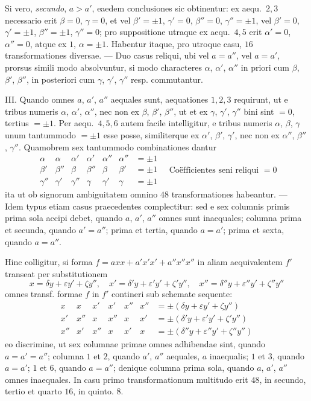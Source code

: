 Si vero, \textit{secundo}, $a>a'$, eaedem conclusiones sic obtinentur: ex aequ.~$2,3$ necessario erit $\beta=0$, $\gamma=0$, et vel $\beta'=\pm1$, $\gamma'=0$, $\beta''=0$, $\gamma''=\pm1$, vel $\beta'=0$, $\gamma'=\pm1$, $\beta''=\pm1$, $\gamma''=0$; pro suppositione utraque ex aequ.~$4,5$ erit $\alpha'=0$, $\alpha''=0$, atque ex $1$, $\alpha=\pm1$. Habentur itaque, pro utroque casu, $16$ transformationes diversae. --- Duo casus reliqui, ubi vel $a=a''$, vel $a=a'$, prorsus simili modo absolvuntur, si modo characteres $\alpha$, $\alpha'$, $\alpha''$ in priori cum $\beta$, $\beta'$, $\beta''$, in posteriori cum $\gamma$, $\gamma'$, $\gamma''$ resp. commutantur.

III. Quando omnes $a$, $a'$, $a''$ aequales sunt, aequationes $1,2,3$ requirunt, ut e tribus numeris $\alpha$, $\alpha'$, $\alpha''$, nec non ex $\beta$, $\beta'$, $\beta''$, ut et ex $\gamma$, $\gamma'$, $\gamma''$ bini sint $=0$, tertius $=\pm1$. Per aequ.~$4,5,6$ autem facile intelligitur, e tribus numeris $\alpha$, $\beta$, $\gamma$ unum tantummodo $=\pm1$ esse posse, similiterque ex $\alpha'$, $\beta'$, $\gamma'$, nec non ex $\alpha''$, $\beta''$, $\gamma''$. Quamobrem sex tantummodo combinationes dantur
\[
\begin{array}{c|c|c|c|c|c|c|}
\alpha&\alpha&\alpha'&\alpha'&\alpha''&\alpha''&=\pm1\\
\beta'&\beta''&\beta&\beta''&\beta&\beta'&=\pm1\\
\gamma''&\gamma'&\gamma''&\gamma&\gamma'&\gamma&=\pm1
\end{array}
\quad\text{Coëfficientes seni reliqui }=0
\]
ita ut ob signorum ambiguitatem omnino $48$ transformationes habeantur. --- Idem typus etiam casus praecedentes complectitur: sed e sex columnis primis prima sola accipi debet, quando $a$, $a'$, $a''$ omnes sunt inaequales; columna prima et secunda, quando $a'=a''$; prima et tertia, quando $a=a'$; prima et sexta, quando $a=a''$.

Hinc colligitur, si forma $f=axx+a'x'x'+a''x''x''$ in aliam aequivalentem $f'$ transeat per substitutionem
\[
x=\delta y+\varepsilon y'+\zeta y'',\quad x'=\delta'y+\varepsilon'y'+\zeta'y'',\quad x''=\delta''y+\varepsilon''y'+\zeta''y''
\]
omnes transf. formae $f$ in $f'$ contineri sub schemate sequente:
\[
\begin{array}{c|c|c|c|c|c|l}
x&x&x'&x'&x''&x''&=\pm(\delta y+\varepsilon y'+\zeta y'')\\
x'&x''&x&x''&x&x'&=\pm(\delta'y+\varepsilon'y'+\zeta'y'')\\
x''&x'&x''&x&x'&x&=\pm(\delta''y+\varepsilon''y'+\zeta''y'')
\end{array}
\]
eo discrimine, ut sex columnae primae omnes adhibendae sint, quando $a=a'=a''$;
columna $1$ et $2$, quando $a'$, $a''$ aequales, $a$ inaequalis; $1$ et $3$, quando $a=a'$; $1$ et $6$, quando $a=a''$; denique columna prima sola, quando $a$, $a'$, $a''$ omnes inaequales. In casu primo transformationum multitudo erit $48$, in secundo, tertio et quarto $16$, in quinto. $8$.

